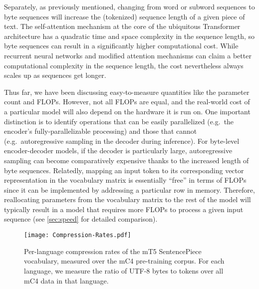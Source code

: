 \documentclass[11pt,a4paper]{article}
\begin{document}
Separately, as previously mentioned, changing from word or subword sequences to byte sequences will increase the (tokenized) sequence length of a given piece of text.
The self-attention mechanism at the core of the ubiquitous Transformer architecture \cite{vaswani2017attention} has a quadratic time and space complexity in the sequence length, so byte sequences can result in a significantly higher computational cost.
While recurrent neural networks and modified attention mechanisms \cite{tay2020efficient} can claim a better computational complexity in the sequence length, the cost nevertheless always scales up as sequences get longer.

Thus far, we have been discussing easy-to-measure quantities like the parameter count and FLOPs.
However, not all FLOPs are equal, and the real-world cost of a particular model will also depend on the hardware it is run on.
One important distinction is to identify operations that can be easily parallelized (e.g.\ the encoder's fully-parallelizable processing) and those that cannot (e.g.\ autoregressive sampling in the decoder during inference).
For byte-level encoder-decoder models, if the decoder is particularly large, autoregressive sampling can become comparatively expensive thanks to the increased length of byte sequences.
Relatedly, mapping an input token to its corresponding vector representation in the vocabulary matrix is essentially ``free'' in terms of FLOPs since it can be implemented by addressing a particular row in memory.
Therefore, reallocating parameters from the vocabulary matrix to the rest of the model will typically result in a model that requires more FLOPs to process a given input sequence (see \cref{sec:speed} for detailed comparison).

\begin{figure*}[h!]
\centering
\texttt{[image: Compression-Rates.pdf]}
     \caption{Per-language compression rates of the mT5 SentencePiece vocabulary, measured over the mC4 pre-training corpus. For each language, we measure the ratio of UTF-8 bytes to tokens over all mC4 data in that language.}
     \label{fig:compression-rates}
\end{figure*}
\end{document}
